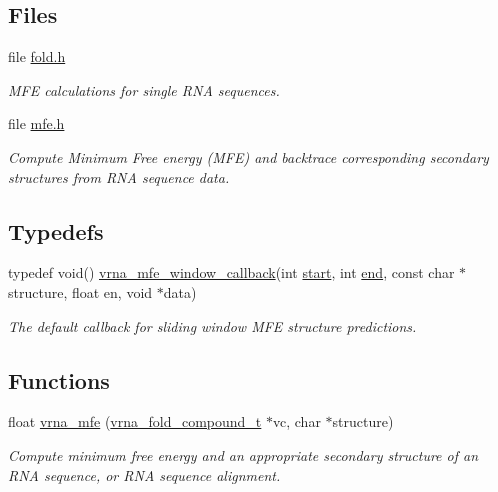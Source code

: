 \subsection*{Files}
\begin{DoxyCompactItemize}
\item 
file \mbox{\hyperlink{fold_8h}{fold.\+h}}
\begin{DoxyCompactList}\small\item\em M\+FE calculations for single R\+NA sequences. \end{DoxyCompactList}\item 
file \mbox{\hyperlink{mfe_8h}{mfe.\+h}}
\begin{DoxyCompactList}\small\item\em Compute Minimum Free energy (M\+FE) and backtrace corresponding secondary structures from R\+NA sequence data. \end{DoxyCompactList}\end{DoxyCompactItemize}
\subsection*{Typedefs}
\begin{DoxyCompactItemize}
\item 
typedef void() \mbox{\hyperlink{group__mfe__fold_ga4f3e5bc214ef803074ace313cb9571b4}{vrna\+\_\+mfe\+\_\+window\+\_\+callback}}(int \mbox{\hyperlink{special__const_8h_ab53016e6941484f46238d59e2549decb}{start}}, int \mbox{\hyperlink{special__const_8h_acc28e141c890270905160748bebdc3ed}{end}}, const char $\ast$structure, float en, void $\ast$data)
\begin{DoxyCompactList}\small\item\em The default callback for sliding window M\+FE structure predictions. \end{DoxyCompactList}\end{DoxyCompactItemize}
\subsection*{Functions}
\begin{DoxyCompactItemize}
\item 
float \mbox{\hyperlink{group__mfe__fold_gabd3b147371ccf25c577f88bbbaf159fd}{vrna\+\_\+mfe}} (\mbox{\hyperlink{group__fold__compound_ga1b0cef17fd40466cef5968eaeeff6166}{vrna\+\_\+fold\+\_\+compound\+\_\+t}} $\ast$vc, char $\ast$structure)
\begin{DoxyCompactList}\small\item\em Compute minimum free energy and an appropriate secondary structure of an R\+NA sequence, or R\+NA sequence alignment. \end{DoxyCompactList}\end{DoxyCompactItemize}


